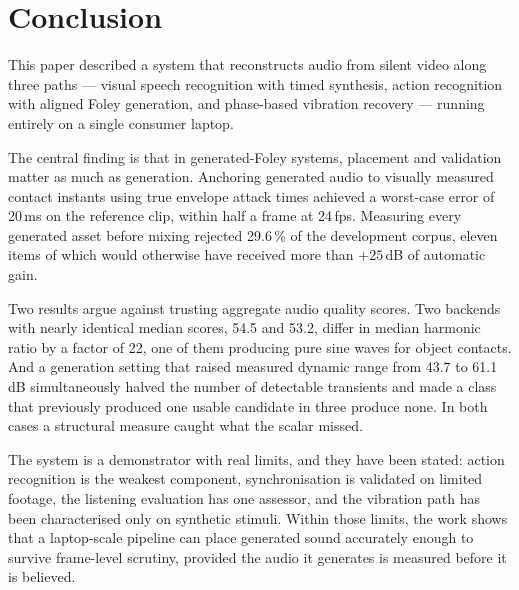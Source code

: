 \documentclass[conference]{IEEEtran}
\begin{document}
\section{Conclusion}

This paper described a system that reconstructs audio from silent video along
three paths --- visual speech recognition with timed synthesis, action
recognition with aligned Foley generation, and phase-based vibration recovery ---
running entirely on a single consumer laptop.

The central finding is that in generated-Foley systems, placement and validation
matter as much as generation. Anchoring generated audio to visually measured
contact instants using true envelope attack times achieved a worst-case error of
20\,ms on the reference clip, within half a frame at 24\,fps. Measuring every
generated asset before mixing rejected 29.6\,\% of the development corpus, eleven
items of which would otherwise have received more than $+25$\,dB of automatic
gain.

Two results argue against trusting aggregate audio quality scores. Two backends
with nearly identical median scores, 54.5 and 53.2, differ in median harmonic
ratio by a factor of 22, one of them producing pure sine waves for object
contacts. And a generation setting that raised measured dynamic range from 43.7 to
61.1\,dB simultaneously halved the number of detectable transients and made a
class that previously produced one usable candidate in three produce none. In
both cases a structural measure caught what the scalar missed.

The system is a demonstrator with real limits, and they have been stated: action
recognition is the weakest component, synchronisation is validated on limited
footage, the listening evaluation has one assessor, and the vibration path has
been characterised only on synthetic stimuli. Within those limits, the work shows
that a laptop-scale pipeline can place generated sound accurately enough to
survive frame-level scrutiny, provided the audio it generates is measured before
it is believed.
\end{document}
